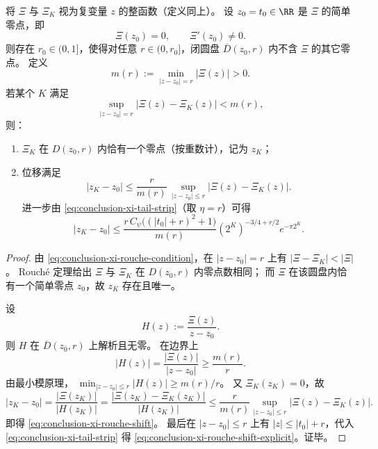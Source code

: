 \begin{theorem}\label{thm:conclusion-xi-rouche-stability}
将 \(\Xi\) 与 \(\Xi_K\) 视为复变量 \(z\) 的整函数（定义同上）。
设 \(z_0=t_0\in\RR\) 是 \(\Xi\) 的简单零点，即
\[
\Xi(z_0)=0,\qquad \Xi'(z_0)\neq 0.
\]
则存在 \(r_0\in(0,1]\)，使得对任意 \(r\in(0,r_0]\)，闭圆盘
\(
\overline{D}(z_0,r)
\)
内不含 \(\Xi\) 的其它零点。
定义
\[
m(r):=\min_{|z-z_0|=r}|\Xi(z)|>0.
\]
若某个 \(K\) 满足
\begin{equation}\label{eq:conclusion-xi-rouche-condition}
\sup_{|z-z_0|=r}|\Xi(z)-\Xi_K(z)|<m(r),
\end{equation}
则：
\begin{enumerate}
  \item \(\Xi_K\) 在 \(D(z_0,r)\) 内恰有一个零点（按重数计），记为 \(z_K\)；
  \item 位移满足
  \begin{equation}\label{eq:conclusion-xi-rouche-shift}
  |z_K-z_0|
  \le
  \frac{r}{m(r)}\,
  \sup_{|z-z_0|\le r}|\Xi(z)-\Xi_K(z)|.
  \end{equation}
  进一步由 \eqref{eq:conclusion-xi-tail-strip}（取 \(\eta=r\)）可得
  \begin{equation}\label{eq:conclusion-xi-rouche-shift-explicit}
  |z_K-z_0|
  \le
  \frac{r\,C_{\psi}\bigl((|t_0|+r)^2+1\bigr)}{m(r)}
  (2^K)^{-3/4+r/2}e^{-\pi 2^K}.
  \end{equation}
\end{enumerate}
\end{theorem}
\begin{proof}
由 \eqref{eq:conclusion-xi-rouche-condition}，在 \(|z-z_0|=r\) 上有
\(
|\Xi-\Xi_K|<|\Xi|
\)。
Rouch\'e 定理给出 \(\Xi\) 与 \(\Xi_K\) 在 \(D(z_0,r)\) 内零点数相同；
而 \(\Xi\) 在该圆盘内恰有一个简单零点 \(z_0\)，故 \(z_K\) 存在且唯一。

设
\[
H(z):=\frac{\Xi(z)}{z-z_0}.
\]
则 \(H\) 在 \(\overline{D}(z_0,r)\) 上解析且无零。
在边界上
\[
|H(z)|=\frac{|\Xi(z)|}{|z-z_0|}\ge \frac{m(r)}{r}.
\]
由最小模原理，
\(
\min_{|z-z_0|\le r}|H(z)|\ge m(r)/r
\)。
又 \(\Xi_K(z_K)=0\)，故
\[
|z_K-z_0|
=
\frac{|\Xi(z_K)|}{|H(z_K)|}
=
\frac{|\Xi(z_K)-\Xi_K(z_K)|}{|H(z_K)|}
\le
\frac{r}{m(r)}\sup_{|z-z_0|\le r}|\Xi(z)-\Xi_K(z)|.
\]
即得 \eqref{eq:conclusion-xi-rouche-shift}。
最后在 \(|z-z_0|\le r\) 上有 \(|z|\le |t_0|+r\)，代入
\eqref{eq:conclusion-xi-tail-strip} 得 \eqref{eq:conclusion-xi-rouche-shift-explicit}。证毕。
\end{proof}

